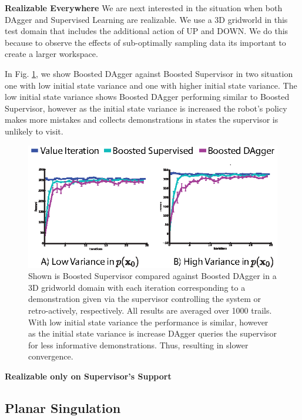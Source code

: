 \documentclass[10pt, conference]{ieeeconf}      %
\begin{document}
\noindent \textbf{Realizable Everywhere} 
We are next interested in the situation when both DAgger and Supervised Learning are realizable. We use a 3D gridworld in this test domain that includes the additional action of UP and DOWN. We do this because to observe the effects of sub-optimally sampling data its important to create a larger workspace. 

In Fig. \ref{fig:r_eq}, we show Boosted DAgger against Boosted Supervisor in two situation one with low initial state variance and one with higher initial state variance. The low initial state variance shows Boosted DAgger performing similar to Boosted Supervisor, however as the initial state variance is increased the robot's policy makes more mistakes and collects demonstrations in states the supervisor is unlikely to visit. 


\begin{figure}
\centering
\includegraphics{f_figs/r_ev.eps}
\caption{
    \footnotesize
Shown is Boosted Supervisor compared against Boosted DAgger in a 3D gridworld domain with each iteration corresponding to a demonstration given via the supervisor controlling the system or retro-actively, respectively. All results are averaged over 1000 trails. With low initial state variance the performance is similar, however as the initial state variance is increase DAgger queries the supervisor for less informative demonstrations. Thus, resulting in slower convergence.   }
\vspace*{-20pt}
\label{fig:r_eq}
\end{figure}



\noindent \textbf{Realizable only on Supervisor's Support} 


\subsection{Planar Singulation}
\end{document}
